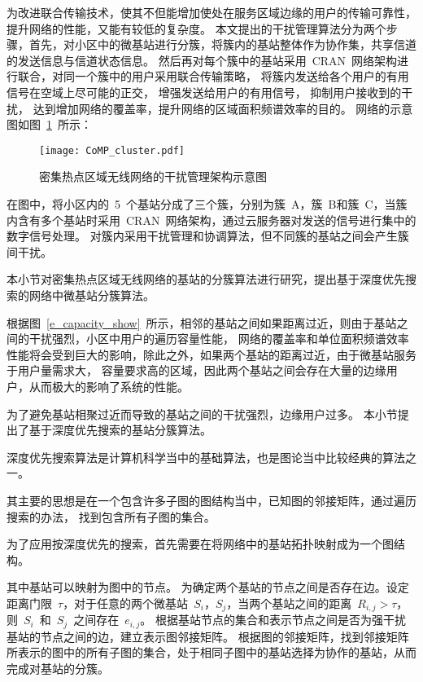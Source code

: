 为改进联合传输技术，使其不但能增加使处在服务区域边缘的用户的传输可靠性，提升网络的性能，又能有较低的复杂度。
本文提出的干扰管理算法分为两个步骤，首先，对小区中的微基站进行分簇，将簇内的基站整体作为协作集，共享信道的发送信息与信道状态信息。
然后再对每个簇中的基站采用~CRAN~网络架构进行联合，对同一个簇中的用户采用联合传输策略，
将簇内发送给各个用户的有用信号在空域上尽可能的正交，
增强发送给用户的有用信号，
抑制用户接收到的干扰，
达到增加网络的覆盖率，提升网络的区域面积频谱效率的目的。
网络的示意图如图~\ref{CoMP_cluster}~所示：
\begin{figure}[htbp]
\centering
\texttt{[image: CoMP\_cluster.pdf]}
\caption{密集热点区域无线网络的干扰管理架构示意图}\vspace{-0.5em}
\label{CoMP_cluster}
\end{figure}
在图中，将小区内的~5~个基站分成了三个簇，分别为簇~A，簇~B和簇~C，当簇内含有多个基站时采用~CRAN~网络架构，通过云服务器对发送的信号进行集中的数字信号处理。
对簇内采用干扰管理和协调算法，但不同簇的基站之间会产生簇间干扰。




本小节对密集热点区域无线网络的基站的分簇算法进行研究，提出基于深度优先搜索的网络中微基站分簇算法。

根据图~\ref{e_capacity_show}~所示，相邻的基站之间如果距离过近，则由于基站之间的干扰强烈，小区中用户的遍历容量性能，
网络的覆盖率和单位面积频谱效率性能将会受到巨大的影响，除此之外，如果两个基站的距离过近，由于微基站服务于用户量需求大，
容量要求高的区域，因此两个基站之间会存在大量的边缘用户，从而极大的影响了系统的性能。

为了避免基站相聚过近而导致的基站之间的干扰强烈，边缘用户过多。
本小节提出了基于深度优先搜索的基站分簇算法。

深度优先搜索算法是计算机科学当中的基础算法，也是图论当中比较经典的算法之一。

其主要的思想是在一个包含许多子图的图结构当中，已知图的邻接矩阵，通过遍历搜索的办法，
找到包含所有子图的集合。

为了应用按深度优先的搜索，首先需要在将网络中的基站拓扑映射成为一个图结构。

其中基站可以映射为图中的节点。
为确定两个基站的节点之间是否存在边。设定距离门限~$\tau$，对于任意的两个微基站~$S_i$，$S_j$，当两个基站之间的距离~$R_{i,j} > \tau$，则~$S_i$~和~$S_j$~之间存在~$e_{i,j}$。
根据基站节点的集合和表示节点之间是否为强干扰基站的节点之间的边，建立表示图邻接矩阵。
根据图的邻接矩阵，找到邻接矩阵所表示的图中的所有子图的集合，处于相同子图中的基站选择为协作的基站，从而完成对基站的分簇。

